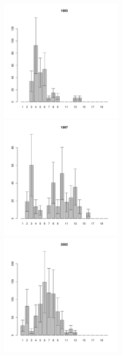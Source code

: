 \documentclass[12pt, a4paper]{article}
\begin{document}
\begin{figure}[h]
\begin{multicols}{3}
\hfill
\includegraphics[width=60mm]{../White_Sea/Luvenga_II_razrez/high_beatch_1993_.pdf}
\hfill
\includegraphics[width=60mm]{../White_Sea/Luvenga_II_razrez/high_beatch_1997_.pdf}
\hfill
\includegraphics[width=60mm]{../White_Sea/Luvenga_II_razrez/high_beatch_2002_.pdf}
\end{multicols}



\end{figure}
\end{document}
